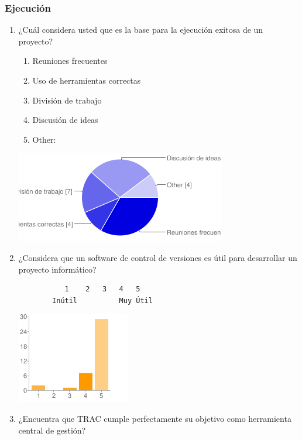 \subsubsection{Ejecución}

\begin{enumerate}
	\item ¿Cuál considera usted que es la base
		para la ejecución exitosa de un proyecto?
		\begin{enumerate}
			\item Reuniones frecuentes
			\item Uso de herramientas correctas
			\item División de trabajo
			\item Discusión de ideas
			\item Other: 
		\end{enumerate}
        \begin{center}
        \includegraphics[scale=0.7]{images/encuesta2/7}
        \end{center}
	\item ¿Considera que un software de control de
		versiones es útil para desarrollar un
		proyecto informático?
		\begin{verbatim}
           1	2	3	4	5
        Inútil			Muy Útil
		\end{verbatim}
        \begin{center}
        \includegraphics[scale=0.7]{images/encuesta2/8}
        \end{center}

	\item ¿Encuentra que TRAC cumple perfectamente
		su objetivo como herramienta central de
		gestión?


\end{enumerate}
